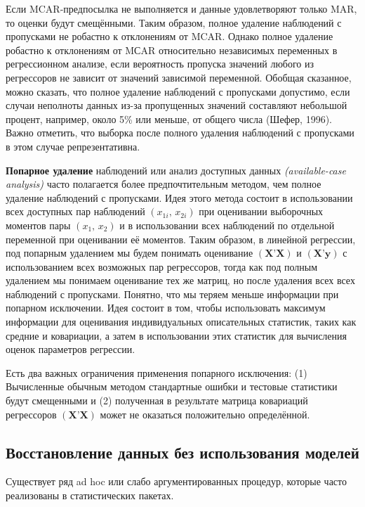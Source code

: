 Если MCAR-предпосылка не выполняется и данные удовлетворяют только MAR, то оценки будут смещёнными. Таким образом, полное удаление наблюдений с пропусками не робастно к отклонениям от MCAR. Однако полное удаление робастно к отклонениям от MСAR относительно независимых 
переменных в регрессионном анализе, если вероятность пропуска значений любого из регрессоров не зависит от значений зависимой переменной. Обобщая сказанное, можно сказать, что полное удаление наблюдений с пропусками допустимо, если случаи неполноты данных из-за пропущенных значений составляют небольшой процент, например, около 5\% или меньше, от общего числа (Шефер, 1996). Важно отметить, что выборка после полного удаления наблюдений с пропусками в этом случае репрезентативна. 


{\bf Попарное удаление} наблюдений  или анализ доступных данных \emph{(available-case analysis)} часто полагается более предпочтительным методом, чем полное удаление наблюдений с пропусками. Идея этого метода состоит в использовании всех доступных пар наблюдений $(x_{1i}, \, x_{2i})$ при оценивании выборочных моментов пары $(x_1, \, x_2)$ и в использовании всех наблюдений по отдельной переменной  при оценивании её моментов. Таким образом, в линейной регрессии, под попарным удалением мы будем понимать оценивание $(\mathbf{X’X})$ и $(\mathbf{X’y})$ с использованием всех возможных пар регрессоров, тогда как под полным удалением мы понимаем оценивание тех же матриц, но после удаления всех всех наблюдений с пропусками. Понятно, что мы теряем меньше информации при попарном исключении. Идея состоит в том, чтобы использовать максимум информации для оценивания индивидуальных описательных статистик, таких как средние и ковариации, а затем в использовании этих статистик для вычисления оценок параметров регрессии.

Есть два важных ограничения применения попарного исключения: (1) Вычисленные обычным методом стандартные ошибки и тестовые статистики будут смещенными и (2) полученная в результате матрица ковариаций регрессоров $(\mathbf{X’X})$ может не оказаться  положительно определённой.

\subsection{Восстановление данных без использования моделей} 

Существует ряд  ad hoc или слабо аргументированных процедур, которые часто реализованы в статистических пакетах.

